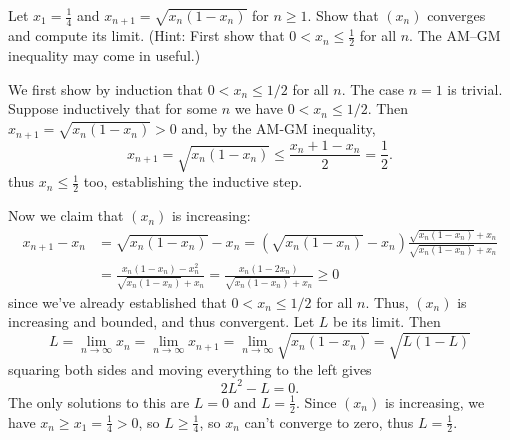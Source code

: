 \documentclass[11pt,dvipsnames]{book}
\numberwithin{figure}{section} %
\numberwithin{table}{section} %
\begin{document}
\begin{exercise}
 Let $x_1=\frac{1}{4}$ and $x_{n+1} = \sqrt{x_{n}(1-x_{n})}$ for $n \geq 1$. Show that $(x_n)$ converges and compute its limit. (Hint: First show that $0< x_{n}\leq \frac{1}{2}$ for all $n$. The AM--GM inequality may come in useful.)

\begin{solution}
We first show by induction that $0 < x_n \leq 1/2$ for all $n$. The case $n=1$ is trivial. Suppose inductively that for some $n$ we have $0 < x_n \leq 1/2$. Then $x_{n+1} =\sqrt{x_{n}(1-x_{n})}>0$ and, by the AM-GM inequality,
\[
x_{n+1}=\sqrt{x_{n}(1-x_{n})}\leq \frac{x_{n}+1-x_{n}}{2} = \frac{1}{2}.
\]
thus $x_{n}\leq \frac{1}{2}$ too, establishing the inductive step.

Now we claim that $(x_{n})$ is increasing:
\begin{align*}
x_{n+1}-x_{n}
& =\sqrt{x_{n}(1-x_{n})}-x_{n}
= \left(\sqrt{x_{n}(1-x_{n})}-x_{n}\right)\frac{\sqrt{x_{n}(1-x_{n})}+x_{n}}{\sqrt{x_{n}(1-x_{n})}+x_{n}}\\
& = \frac{x_{n}(1-x_{n})-x_{n}^{2}}{\sqrt{x_{n}(1-x_{n})}+x_{n}}
= \frac{x_{n}(1-2x_{n})}{\sqrt{x_{n}(1-x_{n})}+x_{n}} \geq 0
\end{align*}
since we've already established that $0 < x_n \leq 1/2$ for all $n$. Thus, $(x_{n})$ is increasing and bounded, and thus convergent. Let $L$ be its limit. Then
\[
L=\lim_{n\rightarrow \infty}x_{n}
=\lim_{n\rightarrow \infty}x_{n+1}
=\lim_{n\rightarrow \infty}\sqrt{x_{n}(1-x_{n})}
=\sqrt{L(1-L)}
\]
squaring both sides and moving everything to the left gives
\[
2L^2-L=0.
\]
The only solutions to this are $L=0$ and $L=\frac{1}{2}$. Since $(x_{n})$ is increasing, we have $x_{n}\geq x_{1} = \frac{1}{4}>0$, so $L\geq \frac{1}{4}$, so $x_{n}$ can't converge to zero, thus $L=\frac{1}{2}$.
\end{solution}
\end{exercise}
\end{document}
